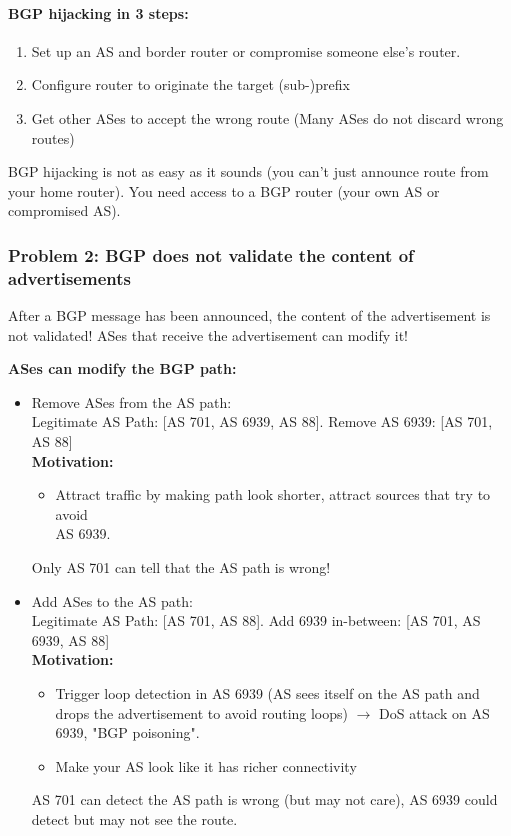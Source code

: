 \paragraph{BGP hijacking in 3 steps:}
\begin{enumerate}
    \item Set up an AS and border router or compromise someone else's router.
    \item Configure router to originate the target (sub-)prefix
    \item Get other ASes to accept the wrong route (Many ASes do not discard wrong routes)
\end{enumerate}
BGP hijacking is not as easy as it sounds (you can't just announce route from your home router). You need access to a BGP router (your own AS or compromised AS).

\subsubsection{Problem 2: BGP does not validate the content of	advertisements}

After a BGP message has been announced, the content of the advertisement is not validated! ASes that receive the advertisement can modify it!

\textbf{ASes can modify the BGP path:}
\begin{itemize}
	\item Remove ASes from the AS path:\\
	Legitimate AS Path: [AS 701, AS 6939, AS 88]. Remove AS 6939: [AS 701, AS 88]\\
	\textbf{Motivation:}
	\begin{itemize}
		\item 	Attract traffic by making path look shorter, attract sources that try to avoid\\
		AS 6939.
	\end{itemize}
	Only AS 701 can tell that the AS path is wrong!
	\item Add ASes to the AS path:\\
	Legitimate AS Path: [AS 701, AS 88]. Add 6939 in-between: [AS 701, AS 6939, AS 88]\\
	\textbf{Motivation:}
	\begin{itemize} 
		\item Trigger loop detection in AS 6939 (AS sees itself on the AS path and drops the advertisement to avoid routing loops) $\rightarrow$ DoS attack on AS 6939, "BGP poisoning".
		\item Make your AS look like it has richer connectivity
	\end{itemize}
	AS 701 can detect the AS path is wrong (but may not care), AS 6939 could detect but may not see the route.
\end{itemize}

